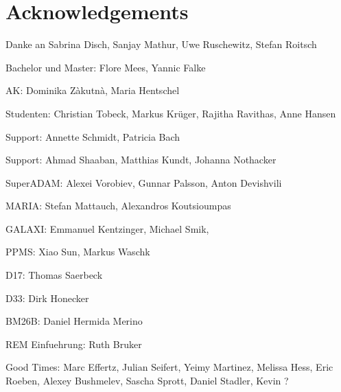 \documentclass[\main/dresen_thesis.tex]{subfiles}
\begin{document}
	\section*{Acknowledgements}
	Danke an Sabrina Disch, Sanjay Mathur, Uwe Ruschewitz, Stefan Roitsch

	Bachelor und Master: Flore Mees, Yannic Falke

	AK: Dominika Zàkutnà, Maria Hentschel

	Studenten: Christian Tobeck, Markus Kr\"uger, Rajitha Ravithas, Anne Hansen

	Support: Annette Schmidt, Patricia Bach

	Support: Ahmad Shaaban, Matthias Kundt, Johanna Nothacker

	SuperADAM: Alexei Vorobiev, Gunnar Palsson, Anton Devishvili

	MARIA: Stefan Mattauch, Alexandros Koutsioumpas

	GALAXI: Emmanuel Kentzinger, Michael Smik,

	PPMS: Xiao Sun, Markus Waschk

	D17: Thomas Saerbeck

	D33: Dirk Honecker

	BM26B: Daniel Hermida Merino

	REM Einfuehrung: Ruth Bruker

	Good Times: Marc Effertz, Julian Seifert, Yeimy Martinez, Melissa Hess, Eric Roeben, Alexey Bushmelev, Sascha Sprott, Daniel Stadler, Kevin ?
\end{document}
